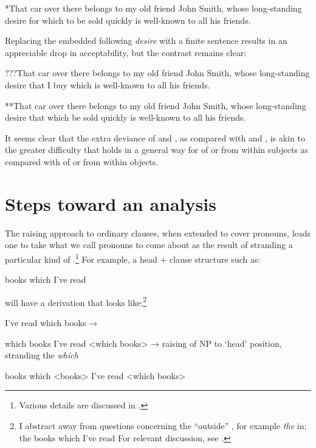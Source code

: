 \documentclass[output=paper]{LSP/langsci}
\begin{document}
\ea\label{ex:kayne:12}
   *That car over there belongs to my old friend John Smith, whose long-standing desire for which to be sold quickly is well-known to all his friends.
\z

Replacing the embedded  following \textit{desire} with a finite sentence results in an appreciable drop in acceptability, but the contrast remains clear:

\ea\label{ex:kayne:13}
   ???That car over there belongs to my old friend John Smith, whose long-standing desire that I buy which is well-known to all his friends.
\z

\ea\label{ex:kayne:14}
   **That car over there belongs to my old friend John Smith, whose long-standing desire that which be sold quickly is well-known to all his friends.
\z

It seems clear that the extra deviance of  and , as compared with  and , is akin to the greater difficulty that holds in a general way for  of or from within subjects as compared with  of or from within objects.

\section{Steps toward an analysis}

     The raising approach to ordinary  clauses, when extended to cover  pronouns, leads one to take what we call  pronouns to come about as the result of stranding a particular kind of .\footnote{Various details are discussed in \citet{Kayne2008a,Kayne2010a}.}  For example, a head +  clause structure such as:

\ea\label{ex:kayne:15}
  books which I’ve read
\z

will have a derivation that looks like:\footnote{I abstract away from questions concerning the ``outside'' , for example \textit{the} in:
   \ea  the books which I’ve read\z
For relevant discussion, see \citet{Leu2014}.}

\ea\label{ex:kayne:16}
   I’ve read which books  →   

        which books I’ve read <which books>  →  raising of NP to ‘head’ position, stranding the   \textit{which}

        books which <books> I’ve read <which books>
\z 
\end{document}
